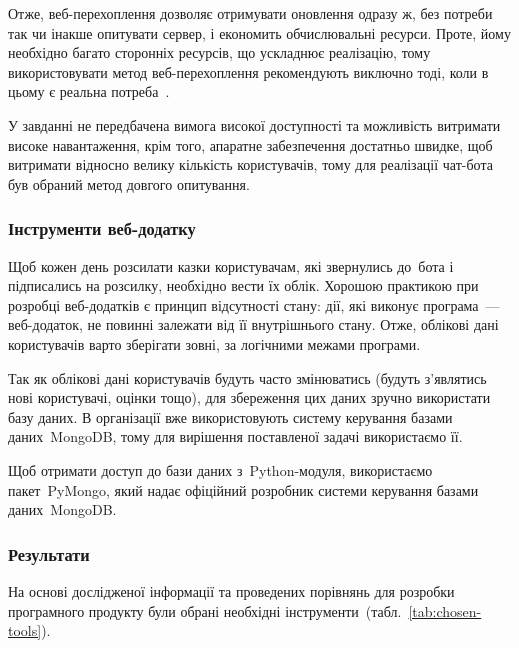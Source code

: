 \documentclass[
	a4paper,
	oneside,
	BCOR = 10mm,
	DIV = 12,
	12pt,
	headings = normal,
]{scrartcl}
\begin{document}
				Отже, веб-перехоплення дозволяє отримувати оновлення одразу ж, без потреби так чи інакше опитувати сервер, і економить обчислювальні ресурси. Проте, йому необхідно багато сторонніх ресурсів, що ускладнює реалізацію, тому використовувати метод веб-перехоплення рекомендують виключно тоді, коли в цьому є реальна потреба~\cite{ptb-longpoll-webhooks}.

				У завданні не передбачена вимога високої доступності та можливість витримати високе навантаження, крім того, апаратне забезпечення достатньо швидке, щоб витримати відносно велику кількість користувачів, тому для реалізації чат-бота був обраний метод довгого опитування.

			\subsubsection{Інструменти веб-додатку}
				Щоб кожен день розсилати казки користувачам, які звернулись до~бота і підписались на розсилку, необхідно вести їх облік. Хорошою практикою при розробці веб-додатків є принцип відсутності стану: дії, які виконує програма~— веб-додаток, не повинні залежати від її внутрішнього стану. Отже, облікові дані користувачів варто зберігати зовні, за логічними межами програми.

				Так як облікові дані користувачів будуть часто змінюватись (будуть з'я\-вля\-тись нові користувачі, оцінки тощо), для збереження цих даних зручно використати базу даних. В організації вже використовують систему керування базами даних~\textenglish{MongoDB}, тому для вирішення поставленої задачі використаємо її.

				Щоб отримати доступ до бази даних з~\textenglish{Python}-модуля, використаємо пакет~\textenglish{PyMongo}, який надає офіційний розробник системи керування базами даних~\textenglish{MongoDB}.

			\subsubsection{Результати}
				На основі дослідженої інформації та проведених порівнянь для розробки програмного продукту були обрані необхідні інструменти~(табл.~\ref{tab:chosen-tools}).
\end{document}
